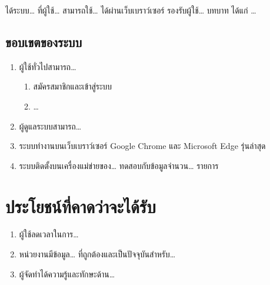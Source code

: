 ได้ระบบ\ldots{} ที่ผู้ใช้\ldots{} สามารถใช้\ldots{} ได้ผ่านเว็บเบราว์เซอร์
รองรับผู้ใช้\ldots{} บทบาท ได้แก่ \ldots{}

\subsection{ขอบเขตของระบบ}


\begin{enumerate}
  \item ผู้ใช้ทั่วไปสามารถ\ldots{}
  \begin{enumerate}
    \item สมัครสมาชิกและเข้าสู่ระบบ
    \item \ldots{}
  \end{enumerate}
  \item ผู้ดูแลระบบสามารถ\ldots{}
  \item ระบบทำงานบนเว็บเบราว์เซอร์ Google Chrome และ Microsoft Edge รุ่นล่าสุด
  \item ระบบติดตั้งบนเครื่องแม่ข่ายของ\ldots{} ทดสอบกับข้อมูลจำนวน\ldots{} รายการ
\end{enumerate}


\section{ประโยชน์ที่คาดว่าจะได้รับ}
\label{sec:benefits}

\begin{enumerate}
  \item ผู้ใช้ลดเวลาในการ\ldots{}
  \item หน่วยงานมีข้อมูล\ldots{} ที่ถูกต้องและเป็นปัจจุบันสำหรับ\ldots{}
  \item ผู้จัดทำได้ความรู้และทักษะด้าน\ldots{}
\end{enumerate}
